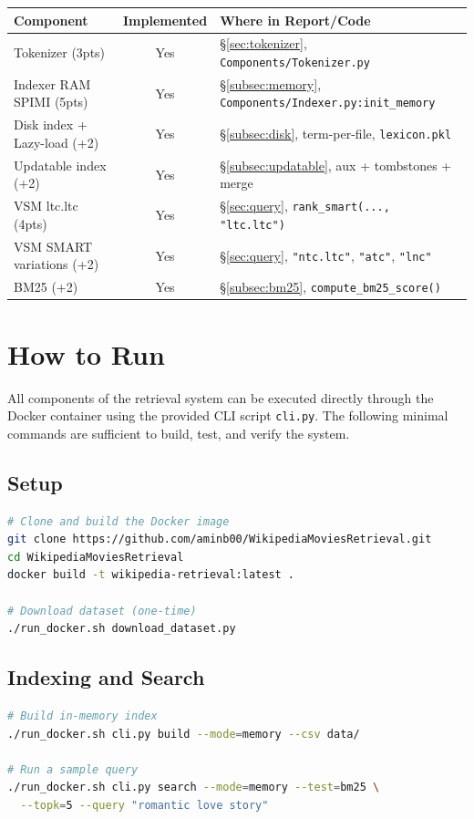 \documentclass[11pt,a4paper]{article}
\begin{document}
\begin{table}[h!]
\centering
\renewcommand{\arraystretch}{1.15}
\begin{tabularx}{\textwidth}{@{} l c X @{}}
\toprule
\textbf{Component} & \textbf{Implemented} & \textbf{Where in Report/Code} \\
\midrule
Tokenizer (3pts) & Yes & \S\ref{sec:tokenizer}, 
\texttt{Components/Tokenizer.py} \\
Indexer RAM SPIMI (5pts) & Yes & \S\ref{subsec:memory}, \texttt{Components/Indexer.py:init\_memory} \\
Disk index + Lazy-load (+2) & Yes & \S\ref{subsec:disk}, term-per-file, \texttt{lexicon.pkl} \\
Updatable index (+2) & Yes & \S\ref{subsec:updatable}, aux + tombstones + merge \\
VSM ltc.ltc (4pts) & Yes & \S\ref{sec:query}, \texttt{rank\_smart(..., "ltc.ltc")} \\
VSM SMART variations (+2) & Yes & \S\ref{sec:query}, \texttt{"ntc.ltc"}, \texttt{"atc"}, \texttt{"lnc"} \\
BM25 (+2) & Yes & \S\ref{subsec:bm25}, \texttt{compute\_bm25\_score()} \\
\bottomrule
\end{tabularx}
\end{table}
\newpage
\section{How to Run}
\label{sec:howtorun}

All components of the retrieval system can be executed directly through the Docker container
using the provided CLI script \texttt{cli.py}.  
The following minimal commands are sufficient to build, test, and verify the system.

\subsection*{Setup}
\begin{lstlisting}[language=bash]
# Clone and build the Docker image
git clone https://github.com/aminb00/WikipediaMoviesRetrieval.git
cd WikipediaMoviesRetrieval
docker build -t wikipedia-retrieval:latest .

# Download dataset (one-time)
./run_docker.sh download_dataset.py
\end{lstlisting}

\subsection*{Indexing and Search}
\begin{lstlisting}[language=bash]
# Build in-memory index
./run_docker.sh cli.py build --mode=memory --csv data/

# Run a sample query
./run_docker.sh cli.py search --mode=memory --test=bm25 \
  --topk=5 --query "romantic love story"
\end{lstlisting}
\end{document}

